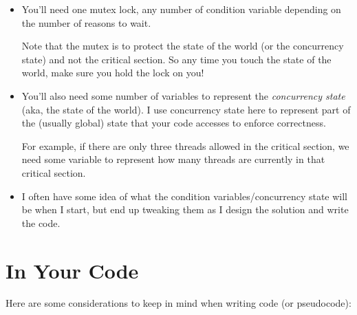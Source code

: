 \documentclass[11pt,usletter]{article}
\begin{document}
\begin{itemize}
  \item You'll need one mutex lock, any number of condition variable depending
    on the number of reasons to wait.

    \noindent Note that the mutex is to protect the state of the world (or the
    concurrency state) and not the critical section. So any time you touch the
    state of the world, make sure you hold the lock on you!

  \item You'll also need some number of variables to represent the {\em
    concurrency state} (aka, the state of the world). I use concurrency state
    here to represent part of the (usually global) state that your code
    accesses to enforce correctness.

    \noindent For example, if there are only three threads allowed in the
    critical section, we need some variable to represent how many threads are
    currently in that critical section.

  \item I often have some idea of what the condition variables/concurrency
    state will be when I start, but end up tweaking them as I design the
    solution and write the code.
\end{itemize}

\section{In Your Code}

Here are some considerations to keep in mind when writing code (or pseudocode):
\end{document}
